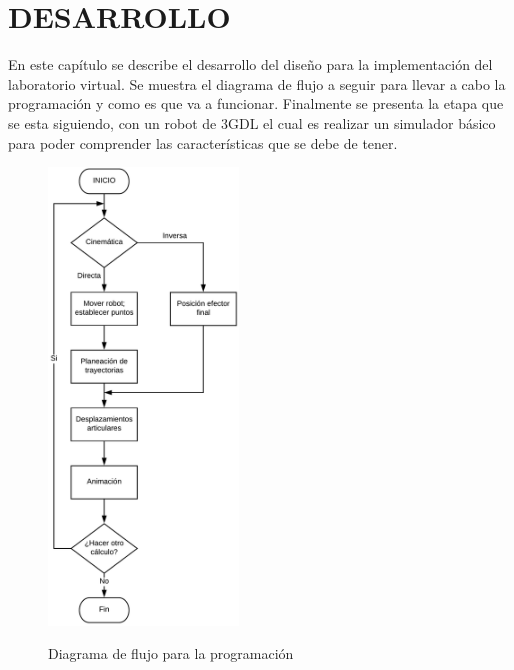 \renewcommand\thechapter{\Roman{chapter}}
\chapter{DESARROLLO} \label{ch:desarrollo} \thispagestyle{fancy}
\renewcommand\thechapter{\arabic{chapter}}
En este capítulo se describe el desarrollo del diseño para la implementación del laboratorio virtual. Se muestra el diagrama de flujo a seguir para llevar a cabo la programación y como es que va a funcionar. Finalmente se presenta la etapa que se esta siguiendo, con un robot de 3GDL el cual es realizar un simulador básico para poder comprender las características que se debe de tener.

\newpage
\begin{figure}[!h]
\centering
\includegraphics[width=0.45\textwidth, height=0.75\textheight]{./figs/diagramaprogramacion}\\
\caption{Diagrama de flujo para la programación}
\label{diagramadeprogramacion}
\end{figure}

